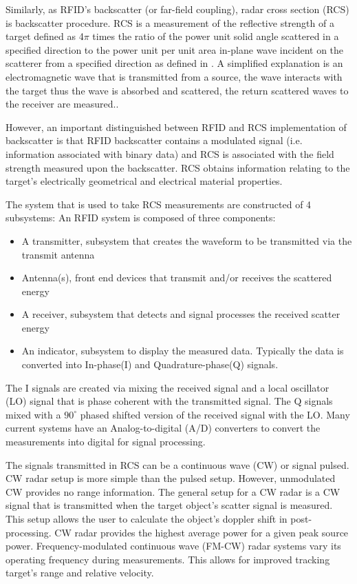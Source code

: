 Similarly, as RFID's backscatter (or far-field coupling), radar cross section (RCS) is backscatter procedure. RCS is a measurement of the reflective strength of a target defined as 4$\pi$ times the ratio of the power unit solid angle scattered in a specified direction to the power unit per unit area in-plane wave incident on the scatterer from a specified direction as defined in \cite{jay1977standard}. A simplified explanation is an electromagnetic wave that is transmitted from a source, the wave interacts with the target thus the wave is absorbed and scattered, the return scattered waves to the receiver are measured..

However, an important distinguished between RFID and RCS implementation of backscatter is that RFID backscatter contains a modulated signal (i.e. information associated with binary data) and RCS is associated with the field strength measured upon the backscatter. RCS obtains information relating to the target's electrically geometrical and electrical material properties.

The system that is used to take RCS measurements are constructed of 4 subsystems: 
An RFID system is composed of three components:
\begin{itemize}
    \item  A transmitter, subsystem that creates the waveform to be transmitted via the transmit antenna
    \item Antenna(s), front end devices that transmit and/or receives the scattered energy   
    \item  A receiver, subsystem that detects and signal processes the received scatter energy
    \item An indicator, subsystem to display the measured data. Typically the data is converted into In-phase(I) and Quadrature-phase(Q) signals.
\end{itemize}

The I signals are created via mixing the received signal and a local oscillator (LO) signal that is phase coherent with the transmitted signal. The Q signals mixed with a $90^\circ$ phased shifted version of the received signal with the LO. Many current systems have an Analog-to-digital (A/D) converters to convert the measurements into digital  for signal processing.  


The signals transmitted in RCS can be a continuous wave (CW) or signal pulsed. CW radar setup is more simple than the pulsed setup. However, unmodulated CW provides no range information. The general setup for a CW radar is a CW signal that is transmitted when the target object's scatter signal is measured. This setup allows the user to calculate the object's doppler shift in post-processing. CW radar provides the highest average power for a given peak source power. Frequency-modulated continuous wave (FM-CW) radar systems vary its operating frequency during measurements. This allows for improved tracking target's range and relative velocity. 


